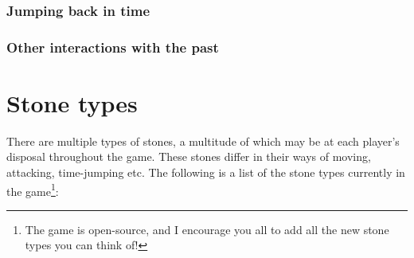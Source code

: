 \documentclass[12pt]{article}
\begin{document}
	\subsubsection{Jumping back in time} \label{sec:timejumps}
	
	\subsubsection{Other interactions with the past}
	
	
	\section{Stone types}\label{sec:stone types}
	There are multiple types of stones, a multitude of which may be at each player's disposal throughout the game. These stones differ in their ways of moving, attacking, time-jumping etc. The following is a list of the stone types currently in the game\footnote{The game is open-source, and I encourage you all to add all the new stone types you can think of!}:
\end{document}
